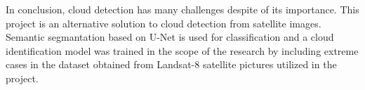 In conclusion, cloud detection has many challenges despite of its importance. This project is an alternative solution to cloud detection from satellite images. Semantic segmantation based on U-Net is used for classification and  a cloud identification model was trained in the scope of the research by including extreme cases in the dataset obtained from Landsat-8 satellite pictures utilized in the project.
